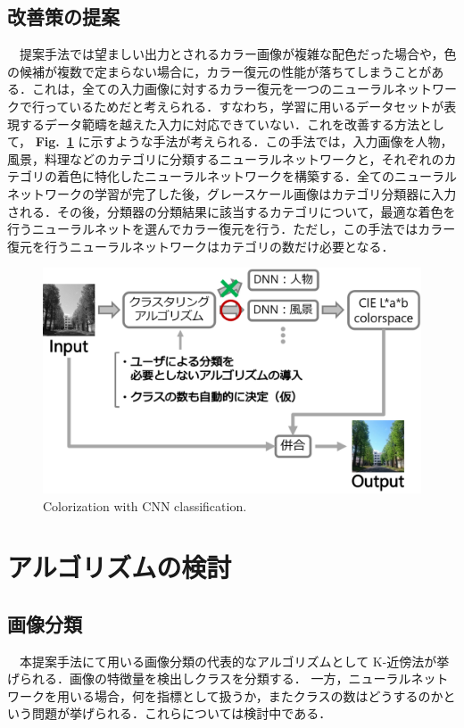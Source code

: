 \documentclass[10pt]{jarticle}
\begin{document}
\subsection{改善策の提案}
\ \ 提案手法では望ましい出力とされるカラー画像が複雑な配色だった場合や，色の候補が複数で定まらない場合に，カラー復元の性能が落ちてしまうことがある．これは，全ての入力画像に対するカラー復元を一つのニューラルネットワークで行っているためだと考えられる．すなわち，学習に用いるデータセットが表現するデータ範疇を越えた入力に対応できていない．これを改善する方法として， {\bf Fig.~\ref{fig:cnn_class}} に示すような手法が考えられる．この手法では，入力画像を人物，風景，料理などのカテゴリに分類するニューラルネットワークと，それぞれのカテゴリの着色に特化したニューラルネットワークを構築する．全てのニューラルネットワークの学習が完了した後，グレースケール画像はカテゴリ分類器に入力される．その後，分類器の分類結果に該当するカテゴリについて，最適な着色を行うニューラルネットを選んでカラー復元を行う．ただし，この手法ではカラー復元を行うニューラルネットワークはカテゴリの数だけ必要となる．
\begin{figure}[tb]
\centering
  \includegraphics[scale=0.5]{../figures/flow.eps}
\caption{Colorization with CNN classification.}
\label{fig:cnn_class}
\end{figure}
\section{アルゴリズムの検討}
\subsection{画像分類}
\ \ 本提案手法にて用いる画像分類の代表的なアルゴリズムとして K-近傍法が挙げられる．画像の特徴量を検出しクラスを分類する．
一方，ニューラルネットワークを用いる場合，何を指標として扱うか，またクラスの数はどうするのかという問題が挙げられる．これらについては検討中である．
\end{document}

